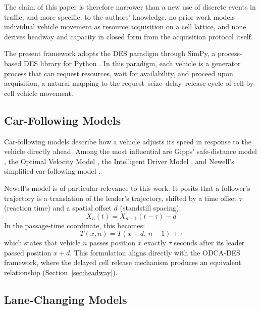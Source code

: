 \documentclass[review,authoryear]{elsarticle}
\begin{document}
The claim of this paper is therefore narrower than a new use of discrete events in traffic, and more specific: to the authors' knowledge, no prior work models individual vehicle movement as resource acquisition on a cell lattice, and none derives headway and capacity in closed form from the acquisition protocol itself.

The present framework adopts the DES paradigm through SimPy, a process-based DES library for Python \citep{simpy2023}. In this paradigm, each vehicle is a generator process that can request resources, wait for availability, and proceed upon acquisition, a natural mapping to the request--seize--delay--release cycle of cell-by-cell vehicle movement.

\subsection{Car-Following Models}
\label{sec:lit_cf}

Car-following models describe how a vehicle adjusts its speed in response to the vehicle directly ahead. Among the most influential are Gipps' safe-distance model \citep{gipps1981behavioural}, the Optimal Velocity Model \citep{bando1995dynamical}, the Intelligent Driver Model \citep{treiber2000congested}, and Newell's simplified car-following model \citep{newell2002simplified}.

Newell's model is of particular relevance to this work. It posits that a follower's trajectory is a translation of the leader's trajectory, shifted by a time offset $\tau$ (reaction time) and a spatial offset $d$ (standstill spacing):
\begin{equation}
    X_{n}(t) = X_{n-1}(t - \tau) - d
    \label{eq:newell_cf}
\end{equation}
In the passage-time coordinate, this becomes:
\begin{equation}
    T(x, n) = T(x + d,\, n-1) + \tau
    \label{eq:newell_cf_Txn}
\end{equation}
which states that vehicle $n$ passes position $x$ exactly $\tau$ seconds after its leader passed position $x + d$. This formulation aligns directly with the ODCA-DES framework, where the delayed cell release mechanism produces an equivalent relationship (Section~\ref{sec:headway}).

\subsection{Lane-Changing Models}
\label{sec:lit_lc}
\end{document}
